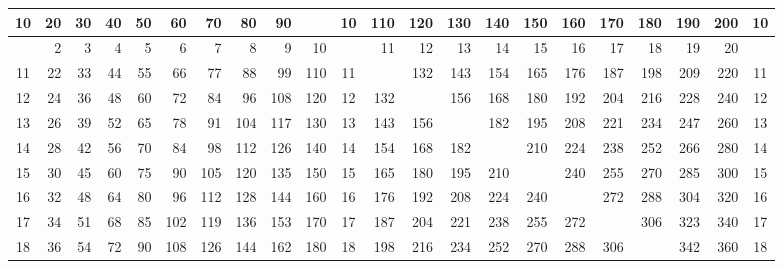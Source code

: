 \begin{center}
{\begin{tabular}{c|rrrrrrrrr|c|rrrrrrrrrr|c}
   10    &   20    &   30    &   40    &   50    &   60    &   70    &   80    &   90    &\q{100}   &   10    &   110    &   120    &  130    &   140    &   150    &  160    &   170    &   180    &   190    &   200    &   10   \\
  \hline
         &    2    &    3    &    4    &    5    &    6    &    7    &    8    &    9    &    10    &         &    11    &    12    &   13    &    14    &    15    &   16    &    17    &    18    &    19    &    20    &        \\
  \hline
   11    &   22    &   33    &   44    &   55    &   66    &   77    &   88    &   99    &   110    &   11    &\q{121}   &   132    &  143    &   154    &   165    &  176    &   187    &   198    &   209    &   220    &   11   \\
   12    &   24    &   36    &   48    &   60    &   72    &   84    &   96    &  108    &   120    &   12    &   132    &\q{144}   &  156    &   168    &   180    &  192    &   204    &   216    &   228    &   240    &   12   \\
   13    &   26    &   39    &   52    &   65    &   78    &   91    &  104    &  117    &   130    &   13    &   143    &   156    &\q{169}  &   182    &   195    &  208    &   221    &   234    &   247    &   260    &   13   \\
   14    &   28    &   42    &   56    &   70    &   84    &   98    &  112    &  126    &   140    &   14    &   154    &   168    &  182    &\q{196}   &   210    &  224    &   238    &   252    &   266    &   280    &   14   \\
   15    &   30    &   45    &   60    &   75    &   90    &  105    &  120    &  135    &   150    &   15    &   165    &   180    &  195    &   210    &\q{225}   &  240    &   255    &   270    &   285    &   300    &   15   \\
   16    &   32    &   48    &   64    &   80    &   96    &  112    &  128    &  144    &   160    &   16    &   176    &   192    &  208    &   224    &   240    &\q{256}  &   272    &   288    &   304    &   320    &   16   \\
   17    &   34    &   51    &   68    &   85    &  102    &  119    &  136    &  153    &   170    &   17    &   187    &   204    &  221    &   238    &   255    &  272    &\q{289}   &   306    &   323    &   340    &   17   \\
   18    &   36    &   54    &   72    &   90    &  108    &  126    &  144    &  162    &   180    &   18    &   198    &   216    &  234    &   252    &   270    &  288    &   306    &\q{324}   &   342    &   360    &   18   \\

\end{tabular}}
\end{center}
